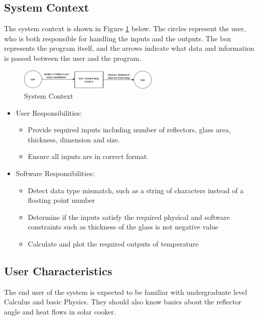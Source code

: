 \documentclass[12pt]{article}
\begin{document}
\subsection{System Context}

The system context is shown in Figure \ref{Fig_SystemContext} below. The circles represent the user, who is both responsible for handling the inputs and the outputs. The box represents the program itself, and the arrows indicate what data and information is passed between the user and the program. 

\begin{figure}[h!]
\begin{center}
\includegraphics[width=0.6\textwidth]{SystemContext}
\caption{System Context}
\label{Fig_SystemContext} 
\end{center}
\end{figure}

\begin{itemize}
\item User Responsibilities:
\begin{itemize}
\item Provide required inputs including number of reflectors, glass area, thickness, dimension and size. 
\item Ensure all inputs are in correct format. 
\end{itemize}

\item Software Responsibilities:
\begin{itemize}
\item Detect data type mismatch, such as a string of characters instead of a
  floating point number
\item Determine if the inputs satisfy the required physical and software constraints such as thickness of the glass is not negative value
\item Calculate and plot the required outputs of temperature
\end{itemize}
\end{itemize}

\subsection{User Characteristics} \label{SecUserCharacteristics}

The end user of the system is expected to be familiar with undergraduate level Calculus and basic Physics. They should also know basics about the reflector angle and heat flows in solar cooker.  
\end{document}
